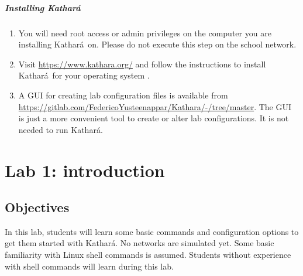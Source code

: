 \documentclass[12pt]{book}
\newcommand{\kathara}{Kathar\'a}
\begin{document}
\begin{enumerate}[label=\arabic*.]
\paragraph{Installing \kathara}

\begin{enumerate}[label=(\arabic*)]
\item You will need root access or admin privileges on
  the computer you are installing \kathara\ on. Please do not execute
  this step on the school network.

\item Visit \url{https://www.kathara.org/} and follow the instructions to install \kathara\ for your operating system \cite{kathara-wiki}.

\item A GUI for creating lab configuration files is available from \url{https://gitlab.com/FedericoYusteenappar/Kathara/-/tree/master}. The GUI is just a more convenient tool to create or alter lab configurations. It is not needed to run \kathara.
  
\end{enumerate}




\chapter{Lab 1: introduction}\label{l1.intro.se}


\section{Objectives}

In this lab, students will learn some basic commands and configuration options to get them started with \kathara. No networks are simulated yet. Some basic familiarity with Linux shell commands is assumed. Students without experience with shell commands will learn during this lab.


\end{enumerate}
\end{document}
